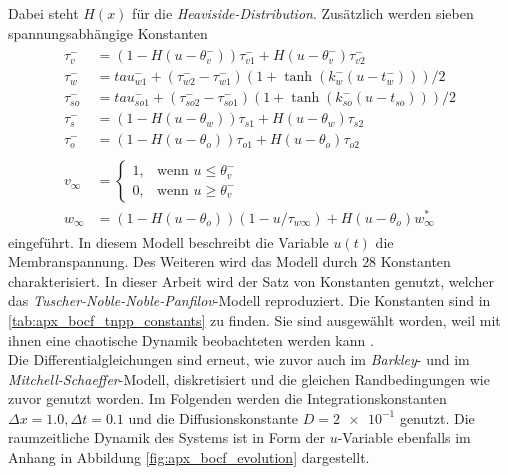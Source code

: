 Dabei steht $H(x)$ für die \textit{Heaviside-Distribution}. Zusätzlich werden sieben spannungsabhängige Konstanten
\begin{align}
\begin{aligned}
\tau_v^-   &= (1-H(u-\theta_v^-))\tau_{v1}^- + H(u-\theta_v^-)\tau_{v2}^- \\
\tau_w^-   &= tau_{w1}^- + (\tau_{w2}^- - \tau_{w1}^-)(1+\tanh(k_w^-(u-t_w^-)))/2 \\
\tau_{so}^- &= tau_{so1}^- + (\tau_{so2}^- - \tau_{so1}^-)(1+\tanh(k_{so}^-(u-t_{so})))/2 \\
\tau_s^-    &= (1-H(u-\theta_w))\tau_{s1} + H(u-\theta_w)\tau_{s2} \\ 
\tau_o^-    &= (1-H(u-\theta_o))\tau_{o1} + H(u-\theta_o)\tau_{o2} \\\\
v_\infty &= \begin{cases}
	1,& \text{wenn } u \leq \theta_v^-\\
    0,& \text{wenn } u \geq \theta_v^-
\end{cases} \\
w_\infty &= (1-H(u-\theta_o))(1-u/\tau_{w\infty}) + H(u-\theta_o)w_\infty^*
\end{aligned}
\end{align}
eingeführt. In diesem Modell beschreibt die Variable $u(t)$ die Membranspannung. Des Weiteren wird das Modell durch $28$ Konstanten charakterisiert. In dieser Arbeit wird der Satz von Konstanten genutzt, welcher das \textit{Tuscher-Noble-Noble-Panfilov}-Modell reproduziert. Die Konstanten sind in \ref{tab:apx_bocf_tnpp_constants} zu finden. Sie sind ausgewählt worden, weil mit ihnen eine chaotische Dynamik beobachteten werden kann \citep{Bueno-Orovio2008}.\\

Die Differentialgleichungen sind erneut, wie zuvor auch im \textit{Barkley}- und im \textit{Mitchell-Schaeffer}-Modell, diskretisiert und die gleichen Randbedingungen wie zuvor genutzt worden. Im Folgenden werden die Integrationskonstanten $\Delta x = 1.0, \Delta t = 0.1$ und die Diffusionskonstante $D = \num{2e-1}$ genutzt. Die raumzeitliche Dynamik des Systems ist in Form der $u$-Variable ebenfalls im Anhang in Abbildung \ref{fig:apx_bocf_evolution} dargestellt.\\

